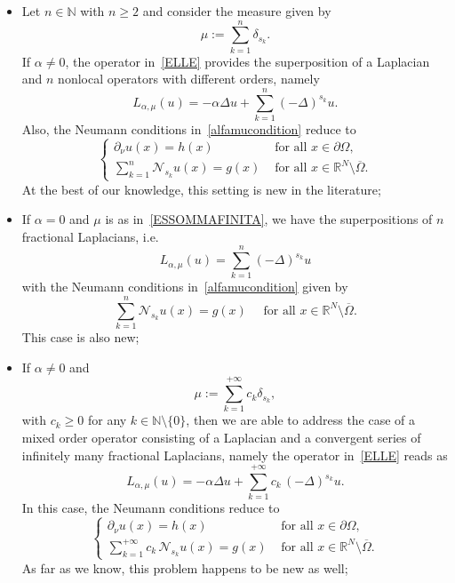 \documentclass[12pt,a4paper,intlimits,sumlimits]{amsart}
\def \N {\mathbb{N}}
\def \R {\mathbb{R}}
\theoremstyle{definition}
\theoremstyle{plain}
\numberwithin{equation}{section}
\renewcommand{\ge}{\geqslant}
\begin{document}
\begin{itemize}
The study of this mixed operator problem under the Neumann condition~\eqref{PS23ENt45I2S}
has emerged in~\cite{MR4438596, MR4651677} and has been further extended in \cite{MPL22}.

\item Let $n\in\N$ with $n\ge 2$ and consider the measure given by
\begin{equation}\label{ESSOMMAFINITA}
\mu:= \sum_{k=1}^n \delta_{s_k}.
\end{equation}
If $\alpha\neq 0$, the operator in~\eqref{ELLE} provides the superposition of a Laplacian and $n$ nonlocal operators with different orders,  namely
\[
L_{\alpha, \mu} (u) = -\alpha \Delta u + \sum_{k=1}^n (-\Delta)^{s_k} u.
\]
Also, the Neumann conditions in~\eqref{alfamucondition} reduce to
\[
\begin{cases}
\partial_\nu u(x)=h(x) & \mbox{ for all } x\in \partial\Omega,\\
\displaystyle\sum_{k=1}^n \mathscr{N}_{s_k} u (x)= g(x) &\mbox{ for all }x\in \R^N \setminus \overline{\Omega}.
\end{cases}
\]
At the best of our knowledge, this setting is new in the literature;
\item If $\alpha=0$ and $\mu$ is as in~\eqref{ESSOMMAFINITA}, we have the superpositions of $n$ fractional Laplacians, i.e.
\[
L_{\alpha, \mu} (u) = \sum_{k=1}^n (-\Delta)^{s_k} u
\]
with the Neumann conditions in~\eqref{alfamucondition} given by
\[
\sum_{k=1}^n\mathscr N_{s_k} u(x) = g(x) \quad\mbox{ for all }x\in \R^N \setminus \overline{\Omega}.
\]
This case is also new;
\item If $\alpha\neq 0$ and 
\begin{equation}\label{ESSERIE}
\mu:= \sum_{k=1}^{+\infty} c_k \delta_{s_k},
\end{equation}
with $c_k\ge 0$ for any $k\in\N\setminus\{0\}$, then we are able to address the case of a mixed order operator consisting of a Laplacian and a convergent series of infinitely many fractional Laplacians, namely the operator in~\eqref{ELLE} reads as
\[
L_{\alpha, \mu} (u) = -\alpha \Delta u + \sum_{k=1}^{+\infty} c_k\, (-\Delta)^{s_k} u.
\]
In this case, the Neumann conditions reduce to 
\[
\begin{cases}
\partial_\nu u(x)=h(x)& \mbox{ for all } x\in \partial\Omega,\\
\displaystyle\sum_{k=1}^{+\infty} c_k \, \mathscr{N}_{s_k} u(x) = g(x)& \mbox{ for all }x\in \R^N \setminus \overline{\Omega}.
\end{cases}
\]
As far as we know, this problem happens to be new as well;

\end{itemize}
\end{document}
